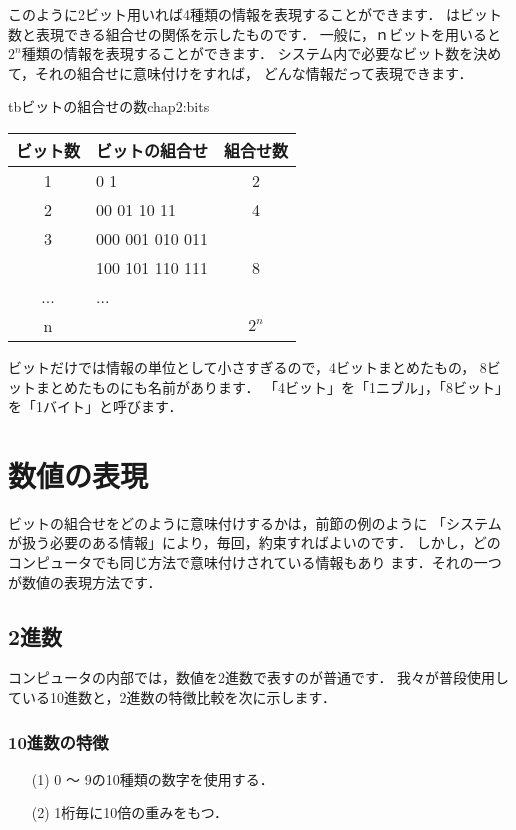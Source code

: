 
このように2ビット用いれば4種類の情報を表現することができます．
はビット数と表現できる組合せの関係を示したものです．
一般に，ｎビットを用いると$2^n$種類の情報を表現することができます．
システム内で必要なビット数を決めて，それの組合せに意味付けをすれば，
どんな情報だって表現できます．

\begin{mytable}{tb}{ビットの組合せの数}{chap2:bits}
{\small\begin{tabular}{c|l|c} \hline\hline
ビット数 & \multicolumn{1}{c|}{ビットの組合せ} & 組合せ数\\
\hline
1 & 0 1   & 2 \\
2 & 00 01 10 11 & 4 \\
3 & 000 001 010 011 &   \\
  & 100 101 110 111 & 8 \\
...& ... &\\
n &  & $2^n$ \\
\end{tabular}}
\end{mytable}

ビットだけでは情報の単位として小さすぎるので，4ビットまとめたもの，
8ビットまとめたものにも名前があります．
「4ビット」を「1ニブル」，「8ビット」を「1バイト」と呼びます．

\section{数値の表現}

ビットの組合せをどのように意味付けするかは，前節の例のように
「システムが扱う必要のある情報」により，毎回，約束すればよいのです．
しかし，どのコンピュータでも同じ方法で意味付けされている情報もあり
ます．それの一つが数値の表現方法です．

\subsection{2進数}

コンピュータの内部では，数値を2進数で表すのが普通です．
我々が普段使用している10進数と，2進数の特徴比較を次に示します．

\subsubsection{10進数の特徴}
\begin{enumerate}
\item[(1)] 0 〜 9の10種類の数字を使用する．
\item[(2)] 1桁毎に10倍の重みをもつ．
\end{enumerate}
